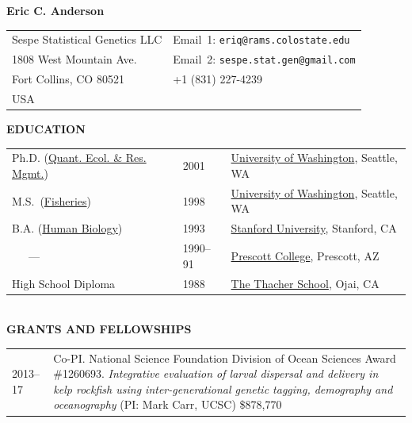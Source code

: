 \documentclass[11pt]{article}
\newlength{\myindent}
\newlength{\postskip}
\newlength{\preskip}
\newlength{\scndcol}
\begin{document}
\begin{center} \LARGE {\bf Eric C. Anderson}\\
\end{center} 
\begin{tabular*}{\textwidth}{@{\extracolsep{\fill}}ll@{}} 
Sespe Statistical Genetics  LLC          &        Email~1: \texttt{eriq@rams.colostate.edu}   \\ 
1808 West Mountain Ave.                    &    Email~2: \texttt{sespe.stat.gen@gmail.com}      \\
Fort Collins, CO 80521                         & +1 (831) 227-4239\\
USA                                                      &  
\end{tabular*}
\vspace*{\postskip}
\nopagebreak

{\bf EDUCATION}
\vspace*{\preskip}\\
\begin{tabular}{@{\hspace{\myindent}}lll   }  Ph.D. (\href{http://depts.washington.edu/qerm/}{Quant. Ecol. \& Res.
Mgmt.})  &  2001   &   \href{http://www.washington.edu/}{University of Washington}, Seattle, WA
\\ M.S.~(\href{http://www.fish.washington.edu/}{Fisheries})         &    1998 & 
\href{http://www.washington.edu/}{University of Washington}, Seattle, WA
\\
B.A. (\href{http://www.stanford.edu/dept/humbio/}{Human Biology})   &  
1993 &
\href{http://www.stanford.edu/}{Stanford University}, Stanford, 
CA
\\
~~~---~~~  &  1990--91  & \href{http://www.prescott.edu/}{Prescott College}, Prescott, AZ  \\
High School Diploma  &  1988  &  \href{http://www.thacher.org/}{The Thacher School}, Ojai, CA
\end{tabular} 
\vspace*{\postskip}\\

{\bf GRANTS AND FELLOWSHIPS}
\vspace*{\preskip}\\
\begin{tabular}{ @{}p{2.5\myindent} p{\scndcol}@{}  }
\hspace*{\myindent}2013--17 &  Co-PI. National Science Foundation Division of Ocean Sciences Award \#1260693. {\em Integrative evaluation of larval dispersal and delivery in kelp rockfish using inter-generational genetic tagging, demography and oceanography} (PI: Mark Carr, UCSC)    \$878,770\\
\end{tabular}
\end{document}
